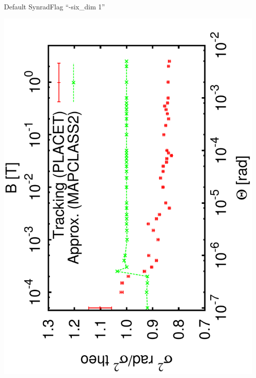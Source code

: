 \documentclass{beamer}
\begin{document}
\begin{frame}%
 \hspace*{2.3cm}Default Synrad\hspace*{3.3cm}Flag ``-six\_dim 1''\par
 \includegraphics[scale=0.24,angle=-90]{sigma_angle.pdf}

\end{frame}
\end{document}
